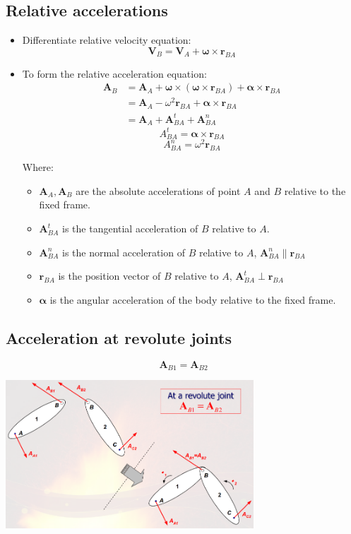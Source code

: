 \documentclass[11pt]{article}
\begin{document}
\subsection{Relative accelerations}
\label{sec:org7786ed9}
\begin{itemize}
\item Differentiate relative velocity equation:
\[\boldsymbol{V}_B = \boldsymbol{V}_A + \boldsymbol{\omega} \times \boldsymbol{r}_{BA}\]
\item To form the relative acceleration equation:
\begin{align*}
\boldsymbol{A}_B &= \boldsymbol{A}_A + \boldsymbol{\omega} \times (\boldsymbol{\omega} \times \boldsymbol{r}_{BA}) + \boldsymbol{\alpha} \times \boldsymbol{r}_{BA} \\
&= \boldsymbol{A}_A - \omega^2 \boldsymbol{r}_{BA} + \boldsymbol{\alpha} \times \boldsymbol{r}_{BA} \\
&= \boldsymbol{A}_A + \boldsymbol{A}_{BA}^t + \boldsymbol{A}_{BA}^n
\end{align*}
\[A_{BA}^t = \boldsymbol{\alpha} \times \boldsymbol{r}_{BA}\]
\[A_{BA}^n = \omega^2 \boldsymbol{r}_{BA}\]

Where:
\begin{itemize}
\item \(\boldsymbol{A}_A, \boldsymbol{A}_B\) are the absolute accelerations of point \(A\) and \(B\) relative to the fixed frame.
\item \(\boldsymbol{A}_{BA}^t\) is the tangential acceleration of \(B\) relative to \(A\).
\item \(\boldsymbol{A}_{BA}^n\) is the normal acceleration of \(B\) relative to \(A\), \(\boldsymbol{A}_{BA}^n \parallel \boldsymbol{r}_{BA}\)
\item \(\boldsymbol{r}_{BA}\) is the position vector of \(B\) relative to \(A\), \(\boldsymbol{A}_{BA}^t \perp \boldsymbol{r}_{BA}\)
\item \(\boldsymbol{\alpha}\) is the angular acceleration of the body relative to the fixed frame.
\end{itemize}
\end{itemize}
\subsection{Acceleration at revolute joints}
\label{sec:org1b7e313}
\[\boldsymbol{A}_{B1} = \boldsymbol{A}_{B2}\]

\begin{center}
\includegraphics[height=15em]{./images/acceleration-at-revolute-joints.png}
\end{center}
\end{document}
